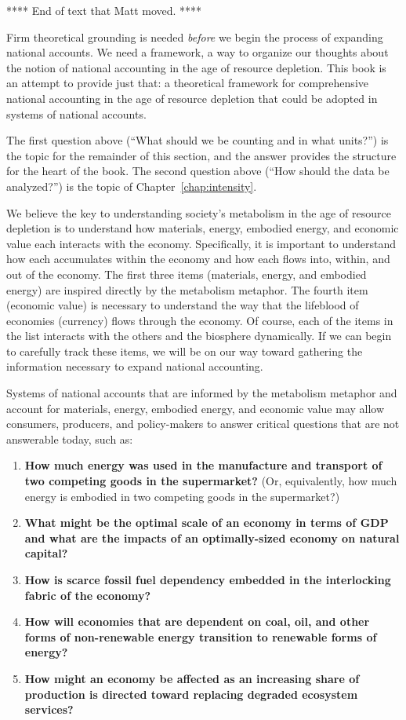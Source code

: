 **** End of text that Matt moved. ****


Firm theoretical grounding is needed 
\emph{before} we begin the process of expanding national accounts.
We need a framework, a way to organize our thoughts about the notion 
of national accounting in the age of resource depletion.
This book is an attempt to provide just that: 
a theoretical framework
for comprehensive national accounting
in the age of resource depletion
that could be adopted in systems of national accounts.

The first question above (``What should we be counting and in what units?'') 
is the topic for the remainder of this section,
and the answer provides the structure for the heart of the book.
The second question above (``How should the data be analyzed?'')
is the topic of Chapter~\ref{chap:intensity}.

We believe the key to understanding society's metabolism
in the age of resource depletion is to understand how 
materials, energy, embodied energy, and economic value
each interacts with the economy.
Specifically, it is important to understand how each
accumulates within the economy and how each flows into, within, and out of the economy.
The first three items (materials, energy, and embodied energy) are
inspired directly by the metabolism metaphor.
The fourth item (economic value) is necessary to understand the way 
that the lifeblood of economies (currency) flows through the economy.
Of course, each of the items in the list interacts with the others 
and the biosphere dynamically.
If we can begin to carefully track these items, 
we will be on our way toward gathering the information necessary to 
expand national accounting.

Systems of national accounts that are informed by the metabolism metaphor 
and account for materials, energy, embodied energy, and economic value
may allow consumers, producers,
and policy-makers to answer critical questions that are not
answerable today, such as:

\begin{enumerate}
	\item{\textbf{How much energy was used in the manufacture and transport
				of two competing goods in the supermarket?} 
				(Or, equivalently, how much energy is embodied 
				in two competing goods in the supermarket?)}
	\item{\textbf{What might be the optimal scale of an economy in terms of GDP 
				and what are the impacts of an optimally-sized economy on natural capital?}}
    \item{\textbf{How is scarce fossil fuel dependency embedded 
    			in the interlocking fabric of the economy?}} 
    \item{\textbf{How will economies that are dependent on coal, oil, 
     			and other forms of non-renewable energy transition 
    			to renewable forms of energy?}}
	\item{\textbf{How might an economy be affected as an increasing share of production
				is directed toward replacing 
				degraded ecosystem services?}~\cite[p.~221]{kummel2011}​}
\end{enumerate}

